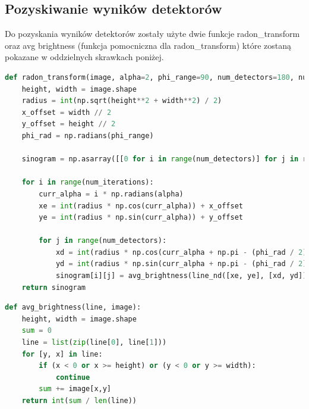 \documentclass[a4paper,11pt]{article}
\begin{document}
    \subsection{Pozyskiwanie wyników detektorów}
    Do pozyskania wyników detektorów zostały użyte dwie funkcje radon\_transform
    oraz avg brightness (funkcja pomocniczna dla radon\_transform) które zostaną pokazane w oddzielnych skrawkach poniżej.
    \begin{lstlisting}[language=Python, caption=Radon transform, basicstyle=\tiny]
def radon_transform(image, alpha=2, phi_range=90, num_detectors=180, num_iterations=90):
    height, width = image.shape
    radius = int(np.sqrt(height**2 + width**2) / 2)
    x_offset = width // 2
    y_offset = height // 2
    phi_rad = np.radians(phi_range)

    sinogram = np.asarray([[0 for i in range(num_detectors)] for j in range(num_iterations)])

    for i in range(num_iterations):
        curr_alpha = i * np.radians(alpha)
        xe = int(radius * np.cos(curr_alpha)) + x_offset
        ye = int(radius * np.sin(curr_alpha)) + y_offset

        for j in range(num_detectors):
            xd = int(radius * np.cos(curr_alpha + np.pi - (phi_rad / 2) + j * phi_rad/(num_detectors-1))) + x_offset
            yd = int(radius * np.sin(curr_alpha + np.pi - (phi_rad / 2) + j * phi_rad/(num_detectors-1))) + y_offset
            sinogram[i][j] = avg_brightness(line_nd([xe, ye], [xd, yd]), image)
    return sinogram
  \end{lstlisting}

  \begin{lstlisting}[language=Python, caption=Average brightness, basicstyle=\tiny]
def avg_brightness(line, image):
    height, width = image.shape
    sum = 0
    line = list(zip(line[0], line[1]))
    for [y, x] in line:
        if (x < 0 or x >= height) or (y < 0 or y >= width):
            continue
        sum += image[x,y]
    return int(sum / len(line))    
  \end{lstlisting}
  
\end{document}
